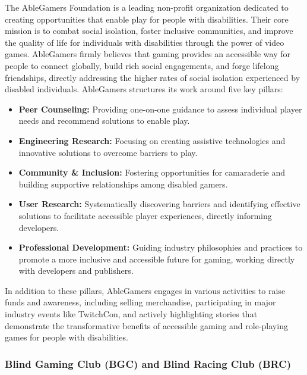 The AbleGamers Foundation is a leading non-profit organization dedicated to creating opportunities that enable play for people with disabilities. Their core mission is to combat social isolation, foster inclusive communities, and improve the quality of life for individuals with disabilities through the power of video games\supercite{AbleGamers2025}. AbleGamers firmly believes that gaming provides an accessible way for people to connect globally, build rich social engagements, and forge lifelong friendships, directly addressing the higher rates of social isolation experienced by disabled individuals\supercite{AbleGamers2025}.
AbleGamers structures its work around five key pillars:
\begin{itemize}
    \item \textbf{Peer Counseling:} Providing one-on-one guidance to assess individual player needs and recommend solutions to enable play\supercite{AbleGamers2025}.
    \item \textbf{Engineering Research:} Focusing on creating assistive technologies and innovative solutions to overcome barriers to play\supercite{AbleGamers2025}.
    \item \textbf{Community \& Inclusion:} Fostering opportunities for camaraderie and building supportive relationships among disabled gamers\supercite{AbleGamers2025}.
    \item \textbf{User Research:} Systematically discovering barriers and identifying effective solutions to facilitate accessible player experiences, directly informing developers\supercite{AbleGamers2025}.
    \item \textbf{Professional Development:} Guiding industry philosophies and practices to promote a more inclusive and accessible future for gaming, working directly with developers and publishers\supercite{AbleGamers2025}.
\end{itemize}
In addition to these pillars, AbleGamers engages in various activities to raise funds and awareness, including selling merchandise, participating in major industry events like TwitchCon, and actively highlighting stories that demonstrate the transformative benefits of accessible gaming and role-playing games for people with disabilities\supercite{AbleGamers2025}.

\subsubsection{Blind Gaming Club (BGC) and Blind Racing Club (BRC)}

